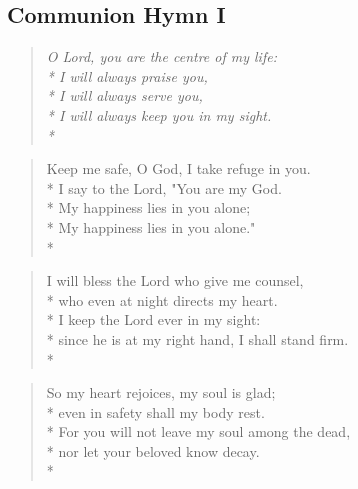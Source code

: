 \documentclass[12pt]{article}
\newcounter{count}
\newcommand\printcount{\addtocounter{count}{1}\thecount}
\begin{document}
\begin{center}
\subsection*{Communion Hymn I}
\end{center}
\begin{multicols}{2}
\setcounter{count}{0}
\setcounter{count}{0}
\begin{verse}
\textit{O Lord, you are the centre of my life:\\*
I will always praise you,\\*
I will always serve you,\\*
I will always keep you in my sight.\\*}
\end{verse}

\begin{verse}
\flagverse{\printcount.} Keep me safe, O God, I take refuge in you.\\*
I say to the Lord, "You are my God.\\*
My happiness lies in you alone;\\*
My happiness lies in you alone."\\*
\end{verse}

\begin{verse}
\flagverse{\printcount.} I will bless the Lord who give me counsel,\\*
who even at night directs my heart.\\*
I keep the Lord ever in my sight:\\*
since he is at my right hand, I shall stand firm.\\*
\end{verse}

\begin{verse}
\flagverse{\printcount.} So my heart rejoices, my soul is glad;\\*
even in safety shall my body rest.\\*
For you will not leave my soul among the dead,\\*
nor let your beloved know decay.\\*
\end{verse}
\end{multicols}
\end{document}
